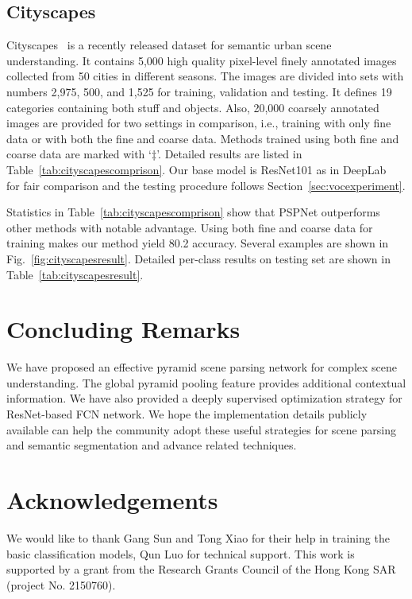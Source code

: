 \documentclass[10pt,twocolumn,letterpaper]{article}
\newcommand{\hszhao}[1]{{{\color{red} #1}}}
\begin{document}
\subsection{Cityscapes}
Cityscapes~\cite{cordts2016cityscapes} is a recently released dataset for semantic urban
scene understanding. It contains 5,000 high quality pixel-level finely annotated images
collected from 50 cities in different seasons. The images are divided into sets with
numbers 2,975, 500, and 1,525 for training, validation and testing. It defines 19
categories containing both stuff and objects. Also, 20,000 coarsely annotated images are
provided for two settings in comparison, i.e., training with only fine data or with both
the fine and coarse data. Methods trained using both fine and coarse data are marked with
`$\ddag$'. Detailed results are listed in Table~\ref{tab:cityscapescomprison}. Our base model is
ResNet101 as in DeepLab~\cite{chen2016deeplab} for fair comparison and the testing procedure
follows Section~\ref{sec:vocexperiment}.

Statistics in Table~\ref{tab:cityscapescomprison} show that PSPNet outperforms other
methods with notable advantage. Using both fine and coarse data for training makes our
method yield 80.2 accuracy. Several examples are shown in
Fig.~\ref{fig:cityscapesresult}. Detailed per-class results on testing set are shown in
Table~\ref{tab:cityscapesresult}.

\vspace{-0.05in}
\section{Concluding Remarks}
We have proposed an effective pyramid scene parsing network for complex scene
understanding. The global pyramid pooling feature provides additional contextual
information. We have also provided a deeply supervised optimization strategy for
ResNet-based FCN network.
We hope the implementation details publicly available can help
the community adopt these useful strategies for scene parsing and semantic segmentation
and advance related techniques.

\section*{Acknowledgements}

We would like to thank Gang Sun and Tong Xiao for their help in training the basic
classification models, Qun Luo for technical support. This work is supported by a grant from the Research Grants Council
of the Hong Kong SAR (project No. 2150760).
\end{document}
